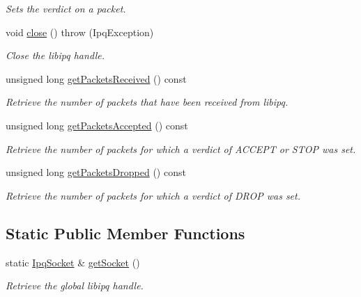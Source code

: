\begin{DoxyCompactItemize}
\begin{DoxyCompactList}\small\item\em \-Sets the verdict on a packet. \end{DoxyCompactList}\item 
void \hyperlink{classIPQ_1_1IpqSocket_a9a6fe5c8f61ae31fc59771f07fa37007}{close} ()  throw (\-Ipq\-Exception)
\begin{DoxyCompactList}\small\item\em \-Close the libipq handle. \end{DoxyCompactList}\item 
unsigned long \hyperlink{classIPQ_1_1IpqSocket_a9e664c8e6a5a549feb27d3052e7ff28b}{get\-Packets\-Received} () const 
\begin{DoxyCompactList}\small\item\em \-Retrieve the number of packets that have been received from libipq. \end{DoxyCompactList}\item 
unsigned long \hyperlink{classIPQ_1_1IpqSocket_a83b3c143170568625923218daf2c6864}{get\-Packets\-Accepted} () const 
\begin{DoxyCompactList}\small\item\em \-Retrieve the number of packets for which a verdict of \-A\-C\-C\-E\-P\-T or \-S\-T\-O\-P was set. \end{DoxyCompactList}\item 
unsigned long \hyperlink{classIPQ_1_1IpqSocket_a902f0bc0d1106b6da00ca4ce18a65ffa}{get\-Packets\-Dropped} () const 
\begin{DoxyCompactList}\small\item\em \-Retrieve the number of packets for which a verdict of \-D\-R\-O\-P was set. \end{DoxyCompactList}\end{DoxyCompactItemize}
\subsection*{\-Static \-Public \-Member \-Functions}
\begin{DoxyCompactItemize}
\item 
static \hyperlink{classIPQ_1_1IpqSocket}{\-Ipq\-Socket} \& \hyperlink{classIPQ_1_1IpqSocket_a036ccfa7bf9f4c81e74e3d52362ba9e8}{get\-Socket} ()
\begin{DoxyCompactList}\small\item\em \-Retrieve the global libipq handle. \end{DoxyCompactList}\end{DoxyCompactItemize}
